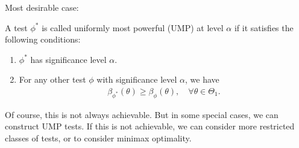 \documentclass[11pt,letterpaper]{article}
\numberwithin{theorem}{lecture}
\numberwithin{proposition}{lecture}
\numberwithin{lemma}{lecture}
\numberwithin{claim}{lecture}
\numberwithin{corollary}{lecture}
\numberwithin{definition}{lecture}
\numberwithin{conjecture}{lecture}
\numberwithin{remark}{lecture}
\numberwithin{example}{lecture}
\numberwithin{equation}{lecture}
\begin{document}
Most desirable case:
\begin{definition}
  A test $\phi^*$ is called uniformly most powerful (UMP) at level $\alpha$ if it satisfies the following conditions:
  \begin{enumerate}
    \item $\phi^*$ has significance level $\alpha$.
    \item For any other test $\phi$ with significance level $\alpha$, we have
    \begin{align*}
      \beta_{\phi^*} (\theta) \geq \beta_\phi (\theta), \quad \forall \theta \in \Theta_1.
    \end{align*}
  \end{enumerate}
\end{definition}
Of course, this is not always achievable. But in some special cases, we can construct UMP tests.
If this is not achievable, we can consider more restricted classes of tests, or to consider minimax optimality.
\end{document}
